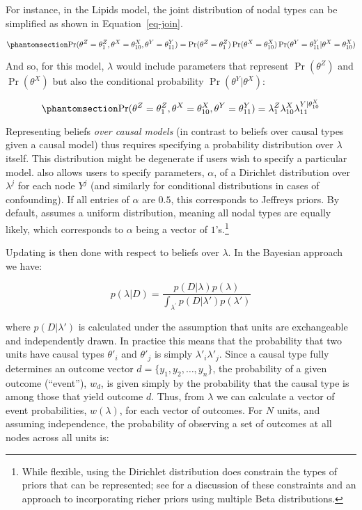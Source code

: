 \documentclass[
  11pt,
  article]{jss}
\begin{document}
For instance, in the Lipids model, the joint distribution of nodal types
can be simplified as shown in Equation~\ref{eq-join}.

\begin{equation}\phantomsection\label{eq-join}{
\Pr(\theta^Z = \theta^Z_1, \theta^X = \theta^X_{10}, \theta^Y = \theta^Y_{11}) = 
\Pr(\theta^Z = \theta^Z_1)\Pr(\theta^X = \theta^X_{10})\Pr(\theta^Y = \theta^Y_{11}|\theta^X = \theta^X_{10})
}\end{equation}

And so, for this model, \(\lambda\) would include parameters that
represent \(\Pr(\theta^Z)\) and \(\Pr(\theta^X)\) but also the
conditional probability \(\Pr(\theta^Y|\theta^X)\):

\begin{equation}\phantomsection\label{eq-join2}{
\Pr(\theta^Z = \theta^Z_1, \theta^X = \theta^X_{10}, \theta^Y = \theta^Y_{11}) = 
\lambda^Z_1\lambda^X_{10}\lambda^{Y|\theta^X_{10}}_{11}
}\end{equation}

Representing beliefs \emph{over causal models} (in contrast to beliefs
over causal types given a causal model) thus requires specifying a
probability distribution over \(\lambda\) itself. This distribution
might be degenerate if users wish to specify a particular model.
 also allows users to specify parameters, \(\alpha\),
of a Dirichlet distribution over \(\lambda^j\) for each node \(Y^j\)
(and similarly for conditional distributions in cases of confounding).
If all entries of \(\alpha\) are \(0.5\), this corresponds to Jeffreys
priors. By default,  assumes a uniform distribution,
meaning all nodal types are equally likely, which corresponds to
\(\alpha\) being a vector of \(1\)'s.\footnote{While flexible, using the
  Dirichlet distribution does constrain the types of priors that can be
  represented; see \citet{irons2023causally} for a discussion of these
  constraints and an approach to incorporating richer priors using
  multiple Beta distributions.}

Updating is then done with respect to beliefs over \(\lambda\). In the
Bayesian approach we have:

\[
p(\lambda|D) = \frac{p(D|\lambda)p(\lambda)}{\int_{\lambda^{'}} p(D|\lambda')p(\lambda')}
\]

where \(p(D|\lambda')\) is calculated under the assumption that units
are exchangeable and independently drawn. In practice this means that
the probability that two units have causal types \(\theta'_i\) and
\(\theta'_j\) is simply \(\lambda'_i\lambda'_j\). Since a causal type
fully determines an outcome vector \(d = \{y_1, y_2,\dots,y_n\}\), the
probability of a given outcome (``event''), \(w_d\), is given simply by
the probability that the causal type is among those that yield outcome
\(d\). Thus, from \(\lambda\) we can calculate a vector of event
probabilities, \(w(\lambda)\), for each vector of outcomes. For \(N\)
units, and assuming independence, the probability of observing a set of
outcomes at all nodes across all units is:
\end{document}
